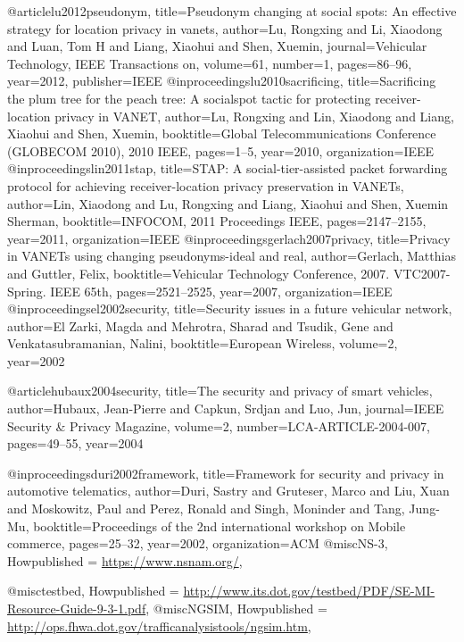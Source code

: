 {{{{{{{{{@article{lu2012pseudonym,
  title={Pseudonym changing at social spots: An effective strategy for location privacy in vanets},
  author={Lu, Rongxing and Li, Xiaodong and Luan, Tom H and Liang, Xiaohui and Shen, Xuemin},
  journal={Vehicular Technology, IEEE Transactions on},
  volume={61},
  number={1},
  pages={86--96},
  year={2012},
  publisher={IEEE}
}
@inproceedings{lu2010sacrificing,
  title={Sacrificing the plum tree for the peach tree: A socialspot tactic for protecting receiver-location privacy in VANET},
  author={Lu, Rongxing and Lin, Xiaodong and Liang, Xiaohui and Shen, Xuemin},
  booktitle={Global Telecommunications Conference (GLOBECOM 2010), 2010 IEEE},
  pages={1--5},
  year={2010},
  organization={IEEE}
}
@inproceedings{lin2011stap,
  title={STAP: A social-tier-assisted packet forwarding protocol for achieving receiver-location privacy preservation in VANETs},
  author={Lin, Xiaodong and Lu, Rongxing and Liang, Xiaohui and Shen, Xuemin Sherman},
  booktitle={INFOCOM, 2011 Proceedings IEEE},
  pages={2147--2155},
  year={2011},
  organization={IEEE}
}
@inproceedings{gerlach2007privacy,
  title={Privacy in VANETs using changing pseudonyms-ideal and real},
  author={Gerlach, Matthias and Guttler, Felix},
  booktitle={Vehicular Technology Conference, 2007. VTC2007-Spring. IEEE 65th},
  pages={2521--2525},
  year={2007},
  organization={IEEE}
}
@inproceedings{el2002security,
  title={Security issues in a future vehicular network},
  author={El Zarki, Magda and Mehrotra, Sharad and Tsudik, Gene and Venkatasubramanian, Nalini},
  booktitle={European Wireless},
  volume={2},
  year={2002}
}

@article{hubaux2004security,
  title={The security and privacy of smart vehicles},
  author={Hubaux, Jean-Pierre and Capkun, Srdjan and Luo, Jun},
  journal={IEEE Security \& Privacy Magazine},
  volume={2},
  number={LCA-ARTICLE-2004-007},
  pages={49--55},
  year={2004}
}



@inproceedings{duri2002framework,
  title={Framework for security and privacy in automotive telematics},
  author={Duri, Sastry and Gruteser, Marco and Liu, Xuan and Moskowitz, Paul and Perez, Ronald and Singh, Moninder and Tang, Jung-Mu},
  booktitle={Proceedings of the 2nd international workshop on Mobile commerce},
  pages={25--32},
  year={2002},
  organization={ACM}
}
@misc{NS-3,
	Howpublished = {\url{https://www.nsnam.org/}}},
}
@misc{testbed,
	Howpublished = {\url{http://www.its.dot.gov/testbed/PDF/SE-MI-Resource-Guide-9-3-1.pdf}}},
@misc{NGSIM,
	Howpublished = {\url{http://ops.fhwa.dot.gov/trafficanalysistools/ngsim.htm}},
	}

}}}}}}}}
